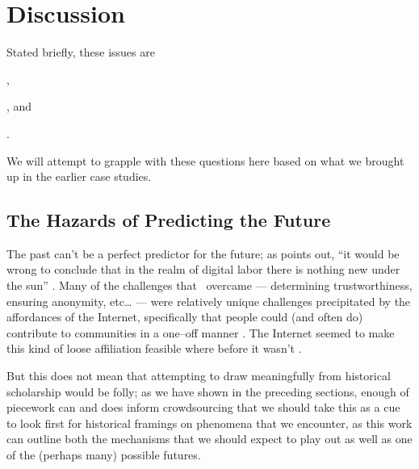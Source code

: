 \documentclass[trackingWork]{subfiles}
\begin{document}
\section{Discussion}
Stated briefly, these issues are 
\begin{inlinelist}
  \item {},
  \item {}, and
  \item {}.
\end{inlinelist}
We will attempt to grapple with these questions here based on
what we brought up in the earlier case studies.


\subsection{The Hazards of Predicting the Future}\label{sec:perilousProblemsPredicting}
The past can't be a perfect predictor for the future;
as \cite{scholz2012digital} points out,
``it would be wrong to conclude that
in the realm of digital labor
there is nothing new under the sun''
\cite{scholz2012digital}.
Many of the challenges that \DO~overcame
--- determining trustworthiness, ensuring anonymity, etc\dots
\cite{dynamo} ---
were relatively unique challenges precipitated by the affordances of the Internet, specifically
that people could (and often do) contribute to communities in a one--off manner
\cite{mcinnis2016one}.
The Internet seemed to make this kind of loose affiliation feasible where before it wasn't
\cite{catalyst,dynamo}.


But this does not mean that
attempting to draw meaningfully from historical scholarship would be folly;
as we have shown in the preceding sections,
enough of piecework can and does inform crowdsourcing that
we should take this as a cue to look first for
historical framings on phenomena that we encounter,
as this work can outline both the mechanisms that we should expect to play out
as well as one of the (perhaps many) possible futures.
\end{document}
